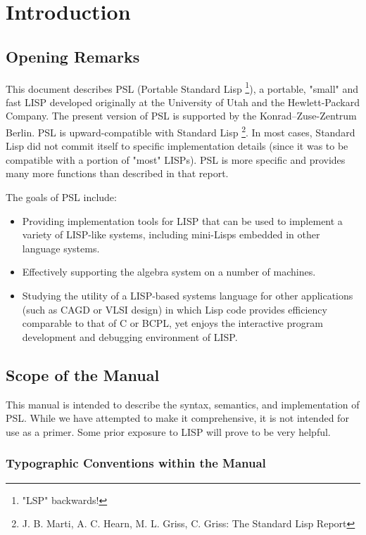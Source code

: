 

\chapter*{Introduction}

\section{Opening Remarks}

 This document describes PSL (Portable Standard Lisp \footnote{
"LSP"  backwards!}),  a portable, "small" and fast LISP developed 
originally at the University  of  Utah and the Hewlett-Packard Company.
The present version of PSL is supported by the Konrad--Zuse-Zentrum Berlin. 
PSL is upward-compatible with Standard Lisp 
\footnote{J. B. Marti, A. C. Hearn, M. L. Griss, C. Griss: 
The Standard Lisp Report}.  In most cases,
Standard Lisp did not commit itself to  specific  implementation
details  (since it was to be compatible with a portion of "most"
LISPs).  PSL is more specific and provides many  more  functions
than described in that report.

The goals of PSL include:
\begin{itemize}
\item Providing implementation tools for LISP that can be used to
     implement   a   variety  of  LISP-like  systems,  including
     mini-Lisps embedded in  other  language  systems.
\item Effectively  supporting the algebra system on a
     number of machines.
\item Studying  the  utility of a LISP-based systems language for
     other applications (such as CAGD or VLSI design)  in  which
     Lisp code provides efficiency comparable to that of C or
     BCPL,  yet  enjoys  the interactive program development and
     debugging environment of LISP.
\end{itemize}

\section{Scope of the Manual}

This manual is intended to describe the syntax, semantics, and
implementation of PSL.  While  we  have  attempted  to  make  it
comprehensive,  it  is  not  intended for use as a primer.  Some
prior exposure to LISP will prove to be very helpful. 

\subsection{Typographic Conventions within the Manual}

